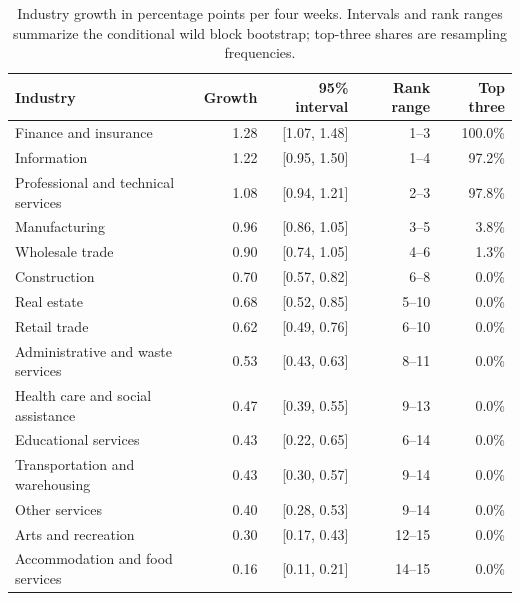 \begin{table}[H]
\centering
\small
\caption{Industry growth in percentage points per four weeks. Intervals and rank ranges summarize the conditional wild block bootstrap; top-three shares are resampling frequencies.}\label{tab:growth}
\begin{tabular}{lrrrr}
\toprule
Industry & Growth & 95\% interval & Rank range & Top three \\
\midrule
Finance and insurance & 1.28 & [1.07, 1.48] & 1--3 & 100.0\% \\
Information & 1.22 & [0.95, 1.50] & 1--4 & 97.2\% \\
Professional and technical services & 1.08 & [0.94, 1.21] & 2--3 & 97.8\% \\
Manufacturing & 0.96 & [0.86, 1.05] & 3--5 & 3.8\% \\
Wholesale trade & 0.90 & [0.74, 1.05] & 4--6 & 1.3\% \\
Construction & 0.70 & [0.57, 0.82] & 6--8 & 0.0\% \\
Real estate & 0.68 & [0.52, 0.85] & 5--10 & 0.0\% \\
Retail trade & 0.62 & [0.49, 0.76] & 6--10 & 0.0\% \\
Administrative and waste services & 0.53 & [0.43, 0.63] & 8--11 & 0.0\% \\
Health care and social assistance & 0.47 & [0.39, 0.55] & 9--13 & 0.0\% \\
Educational services & 0.43 & [0.22, 0.65] & 6--14 & 0.0\% \\
Transportation and warehousing & 0.43 & [0.30, 0.57] & 9--14 & 0.0\% \\
Other services & 0.40 & [0.28, 0.53] & 9--14 & 0.0\% \\
Arts and recreation & 0.30 & [0.17, 0.43] & 12--15 & 0.0\% \\
Accommodation and food services & 0.16 & [0.11, 0.21] & 14--15 & 0.0\% \\
\bottomrule
\end{tabular}
\end{table}
